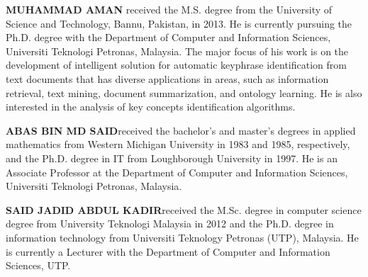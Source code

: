 \documentclass{ieeeaccess}
\begin{document}
\begin{IEEEbiography}{\textbf{MUHAMMAD AMAN}} received the M.S. degree from the University of Science and Technology, Bannu, Pakistan, in 2013. He is currently pursuing the Ph.D. degree with the Department of Computer and Information Sciences, Universiti Teknologi Petronas, Malaysia. The major focus of his work is on the development of intelligent solution for automatic keyphrase identification from text documents that has diverse applications in areas, such as information retrieval, text mining, document summarization, and ontology learning. He is also interested in the analysis of key concepts identification algorithms.
\end{IEEEbiography}

\begin{IEEEbiography}{\textbf{ABAS BIN MD SAID}}received the bachelor’s and master’s degrees in applied mathematics from Western Michigan University in 1983 and 1985, respectively, and the Ph.D. degree in IT from Loughborough University in 1997. He is an Associate Professor at the Department of Computer and Information Sciences, Universiti Teknologi Petronas, Malaysia.
\end{IEEEbiography}
\vspace{-8 cm}

\begin{IEEEbiography}{\textbf{SAID JADID ABDUL KADIR}}received the M.Sc. degree in computer science degree from University Teknologi Malaysia in 2012 and the Ph.D. degree in information technology from Universiti Teknology Petronas (UTP), Malaysia. He is currently a Lecturer with the Department of Computer and Information Sciences, UTP.
\end{IEEEbiography}
\vspace{-8 cm}
\end{document}
